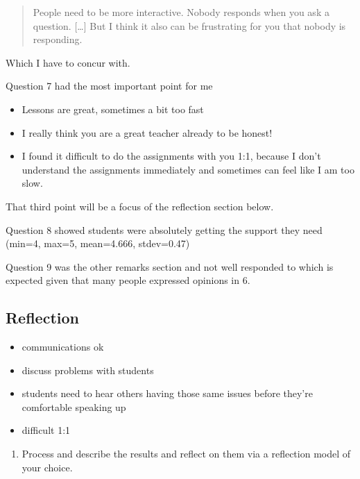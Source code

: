 \documentclass[paper=a4,justified,a4paper]{tufte-handout}
\providecommand{\tightlist}{%
  \setlength{\itemsep}{0pt}\setlength{\parskip}{0pt}}
\begin{document}
\begin{quote}
People need to be more interactive. Nobody responds when you ask a
question. {[}\ldots{}{]} But I think it also can be frustrating for you
that nobody is responding.
\end{quote}

Which I have to concur with.

Question 7 had the most important point for me

\begin{itemize}
\tightlist
\item
  Lessons are great, sometimes a bit too fast
\item
  I really think you are a great teacher already to be honest!
\item
  I found it difficult to do the assignments with you 1:1, because I
  don't understand the assignments immediately and sometimes can feel
  like I am too slow.
\end{itemize}

That third point will be a focus of the reflection section below.

Question 8 showed students were absolutely getting the support they need
(min=4, max=5, mean=4.666, stdev=0.47)

Question 9 was the other remarks section and not well responded to which
is expected given that many people expressed opinions in 6.

\hypertarget{reflection}{%
\subsection{Reflection}\label{reflection}}

\begin{itemize}
\tightlist
\item
  communications ok
\item
  discuss problems with students
\item
  students need to hear others having those same issues before they're
  comfortable speaking up
\item
  difficult 1:1
\end{itemize}

\begin{enumerate}
\def\labelenumi{\arabic{enumi}.}
\setcounter{enumi}{3}
\tightlist
\item
  Process and describe the results and reflect on them via a reflection
  model of your choice.
\end{enumerate}
\end{document}
